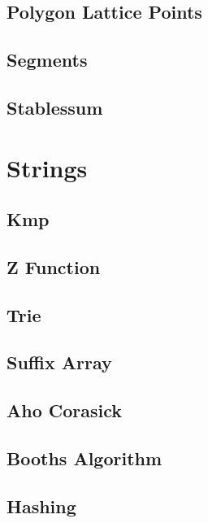 \documentclass[10pt]{article}
\begin{document}
\subsection{\texorpdfstring{{Polygon Lattice Points}}{{Polygon Lattice Points}}}

\subsection{\texorpdfstring{{Segments}}{{Segments}}}

\subsection{\texorpdfstring{{Stablessum}}{{Stablessum}}}


\section{Strings}
\subsection{\texorpdfstring{{Kmp}}{{Kmp}}}

\subsection{\texorpdfstring{{Z Function}}{{Z Function}}}

\subsection{\texorpdfstring{{Trie}}{{Trie}}}

\subsection{\texorpdfstring{{Suffix Array}}{{Suffix Array}}}

\subsection{\texorpdfstring{{Aho Corasick}}{{Aho Corasick}}}

\subsection{\texorpdfstring{{Booths Algorithm}}{{Booths Algorithm}}}

\subsection{\texorpdfstring{{Hashing}}{{Hashing}}}

\end{document}

